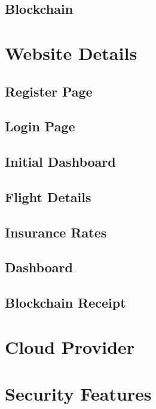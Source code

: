\subsection{Blockchain}

\section{Website Details}
\subsection{Register Page}
\subsection{Login Page}
\subsection{Initial Dashboard}
\subsection{Flight Details}
\subsection{Insurance Rates}
\subsection{Dashboard}
\subsection{Blockchain Receipt}

\section{Cloud Provider}

\section{Security Features}